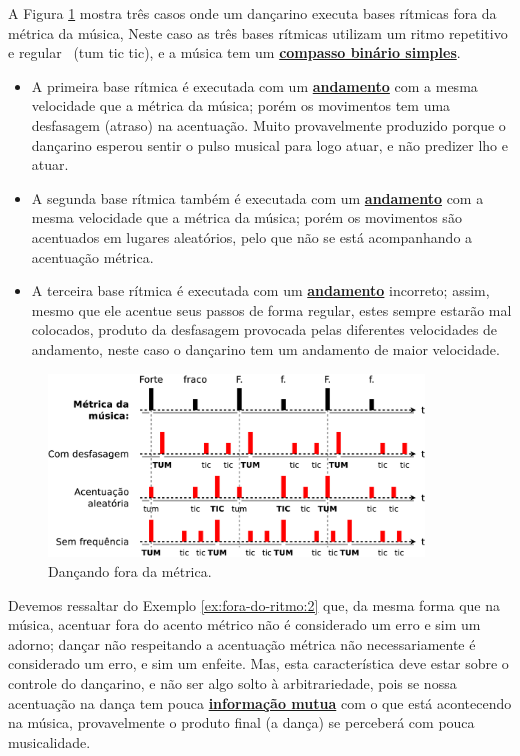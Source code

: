 \begin{example}
\label{ex:fora-do-ritmo:2}
A Figura \ref{fig:fora-do-ritmo-sem} mostra três casos 
onde um dançarino executa bases rítmicas fora da métrica da música,
Neste caso as três bases rítmicas utilizam um ritmo repetitivo e regular \Vier \Acht \Acht~(tum tic tic),
e a música  tem um \hyperref[subsec:compassobinario]{\textbf{compasso binário simples}}.
\begin{itemize}
\item A primeira base rítmica é executada com um \hyperref[sec:Andamento]{\textbf{andamento}} com
a mesma velocidade que a métrica da música; 
porém os movimentos tem uma desfasagem (atraso) na acentuação. 
Muito provavelmente produzido porque o dançarino esperou sentir o pulso musical para logo atuar,
e não predizer lho e atuar. 
\item A segunda base rítmica também é executada com um \hyperref[sec:Andamento]{\textbf{andamento}} com
a mesma velocidade que a métrica da música; 
porém os movimentos são acentuados em lugares aleatórios, 
pelo que não se está acompanhando a acentuação métrica.
\item A terceira base rítmica é executada com um \hyperref[sec:Andamento]{\textbf{andamento}} incorreto;
assim, mesmo que ele acentue seus passos de forma regular, estes sempre estarão mal colocados,
produto da desfasagem provocada pelas diferentes velocidades de andamento,
neste caso o dançarino tem um andamento de maior velocidade.
\end{itemize}
\end{example}
\begin{figure}[!h]
    \centering 
    \includegraphics[width=0.89\textwidth]{chapters/cap-musicalidade/fora-do-ritmo-sem.eps}
    \caption{Dançando fora da métrica.}
    \label{fig:fora-do-ritmo-sem}
\end{figure}

Devemos ressaltar do Exemplo \ref{ex:fora-do-ritmo:2} que,
da mesma forma que na música, acentuar fora do acento métrico não é considerado um erro e sim um adorno; 
dançar não respeitando a acentuação métrica não necessariamente é considerado um erro,
e sim um enfeite. Mas, esta característica deve estar sobre o controle do dançarino,
e não ser algo solto à arbitrariedade, 
pois se nossa acentuação na dança tem pouca 
\hyperref[sec:musicalidadeinfmutua]{\textbf{informação mutua}} com o que está acontecendo na música, 
provavelmente o produto final (a dança) se perceberá com pouca musicalidade.  


